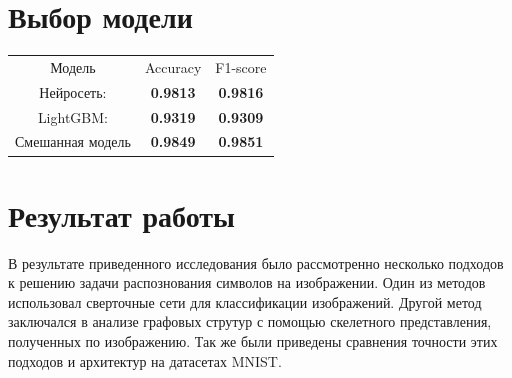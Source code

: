 \documentclass{llncs}
\begin{document}
\section{Выбор модели}
\begin{table}
\label{tabular:timesandtenses}
\begin{center}
\begin{tabular}{ccc}
Модель & Accuracy & F1-score \\
Нейросеть: & \textbf{0.9813} & \textbf{0.9816} \\
LightGBM: & \textbf{0.9319} & \textbf{0.9309} \\
Смешанная модель & \textbf{0.9849} & \textbf{0.9851} \\
\end{tabular}
\end{center}
\end{table}

\section{Результат работы}
В результате приведенного исследования было рассмотренно несколько подходов к решению задачи распознования символов на изображении. Один из методов использовал сверточные сети для классификации изображений. Другой метод заключался в анализе графовых струтур с помощью скелетного представления, полученных по изображению. Так же были приведены сравнения точности этих подходов и архитектур на датасетах MNIST.
\end{document}
